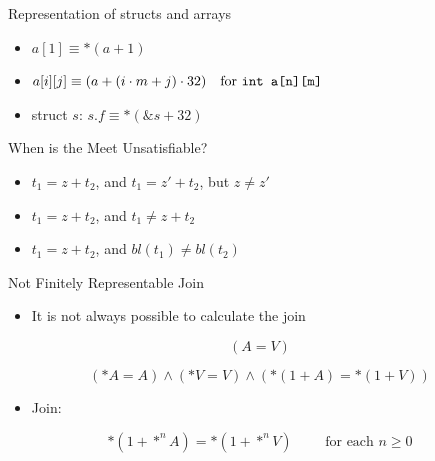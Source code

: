 \documentclass[aspectratio=169]{beamer}
\begin{document}
\begin{frame}{Representation of structs and arrays}
    \begin{itemize}
        \item $a[1]\equiv *(a+1)$
        \item $a[i][j] \equiv (a + (i \cdot m + j) \cdot 32) \quad \text{for \texttt{int a[n][m]}}$
        \item struct $s$: $s.f \equiv *(\&s + 32)$
    \end{itemize}
\end{frame}



\begin{frame}{When is the Meet Unsatisfiable?}
    \begin{itemize}

        \item $t_1 = z + t_2$, and $t_1 = z' + t_2$, but $z\neq z'$

        \item $t_1 = z + t_2$, and $t_1 \neq z + t_2$

        \item $t_1 = z + t_2$, and $bl(t_1) \neq bl(t_2)$


    \end{itemize}
\end{frame}


\begin{frame}{Not Finitely Representable Join}
    \begin{itemize}
        \item It is not always possible to calculate the join
    \end{itemize}

    \[
        (A = V)
    \]

    \[
        (*A = A)\land (*V=V) \land (*(1 + A) = *(1 + V))
    \]
    \begin{itemize}
        \item Join:
    \end{itemize}
    \[
        *(1+*^n A) = *(1 + *^n V)\quad\quad\text{ for each $n \geq 0$}
    \]
\end{frame}
\end{document}

